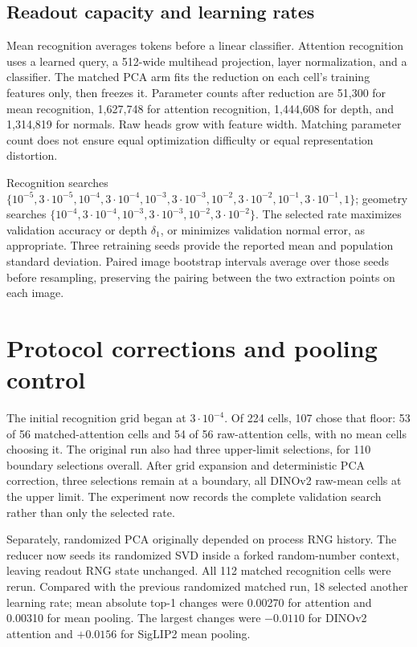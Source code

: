 \subsection{Readout capacity and learning rates}
Mean recognition averages tokens before a linear classifier. Attention recognition uses
a learned query, a 512-wide multihead projection, layer normalization, and a classifier.
The matched PCA arm fits the reduction on each cell's training features only, then
freezes it. Parameter counts after reduction are 51,300 for mean recognition,
1,627,748 for attention recognition, 1,444,608 for depth, and 1,314,819 for normals.
Raw heads grow with feature width. Matching parameter count does not ensure equal
optimization difficulty or equal representation distortion.

Recognition searches
$\{10^{-5},3\cdot10^{-5},10^{-4},3\cdot10^{-4},10^{-3},3\cdot10^{-3},
10^{-2},3\cdot10^{-2},10^{-1},3\cdot10^{-1},1\}$;
geometry searches
$\{10^{-4},3\cdot10^{-4},10^{-3},3\cdot10^{-3},10^{-2},3\cdot10^{-2}\}$.
The selected rate maximizes validation accuracy or depth $\delta_1$, or minimizes
validation normal error, as appropriate. Three retraining seeds provide the reported
mean and population standard deviation. Paired image bootstrap intervals
\citep{efron1993bootstrap} average over those seeds before resampling, preserving the
pairing between the two extraction points on each image.

\section{Protocol corrections and pooling control}
\label{app:corrections}
The initial recognition grid began at $3\cdot10^{-4}$. Of 224 cells, 107 chose that
floor: 53 of 56 matched-attention cells and 54 of 56 raw-attention cells, with no mean
cells choosing it. The original run also had three upper-limit selections, for 110
boundary selections overall. After grid expansion and deterministic PCA correction,
three selections remain at a boundary, all DINOv2 raw-mean cells at the upper limit. The experiment now records the
complete validation search rather than only the selected rate.

Separately, randomized PCA originally depended on process RNG history. The reducer now
seeds its randomized SVD inside a forked random-number context, leaving readout RNG
state unchanged. All 112 matched recognition cells were rerun. Compared with the
previous randomized matched run, 18 selected another learning rate; mean absolute top-1
changes were 0.00270 for attention and 0.00310 for mean pooling. The largest changes
were $-0.0110$ for DINOv2 attention and $+0.0156$ for SigLIP2 mean pooling.


